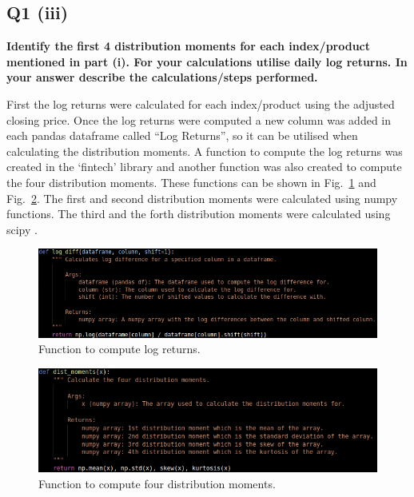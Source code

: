 

\subsection{Q1 (iii)}\label{sssec:pt1q1iii}

\textbf{Identify the first 4 distribution moments for each index/product mentioned in part (i). For your
calculations utilise daily log returns. In your answer describe the calculations/steps performed.}

\noindent
First the log returns were calculated for each index/product using the adjusted closing price. Once the log returns were computed a new column was added in each pandas dataframe called “Log Returns”, so it can be utilised when calculating the distribution moments.  A function to compute the log returns was created in the ‘fintech’ library and another function was also created to compute the four distribution moments. These functions can be shown in Fig.~\ref{fig:logretfunc} and Fig.~\ref{fig:distmomfunc}. The first and second distribution moments were calculated using numpy \cite{python:numpy} functions. The third and the forth distribution moments were calculated using scipy \cite{python:scipy}. \\

\begin{figure}[H]
\centering
  \includegraphics[scale = .65]{imgs/log_diff_func.png}
  \caption{Function to compute log returns.}
  \label{fig:logretfunc}
\end{figure}

\begin{figure}[H]
\centering
  \includegraphics[scale = .7]{imgs/dist_mom_func.png}
  \caption{Function to compute four distribution moments.}
  \label{fig:distmomfunc}
\end{figure} \\

